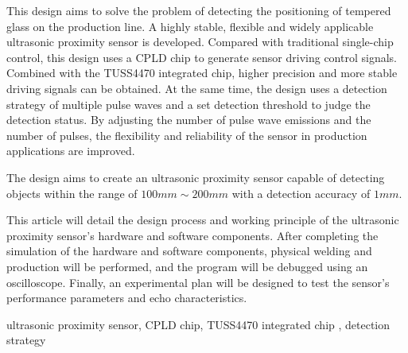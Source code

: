 \begin{EnAbstract}
    
    This design aims to solve the problem of detecting the positioning of tempered glass on the production line. A highly stable, flexible and widely applicable ultrasonic proximity sensor is developed. Compared with traditional single-chip control, this design uses a CPLD chip to generate sensor driving control signals. Combined with the TUSS4470 integrated chip, higher precision and more stable driving signals can be obtained. At the same time, the design uses a detection strategy of multiple pulse waves and a set detection threshold to judge the detection status. By adjusting the number of pulse wave emissions and the number of pulses, the flexibility and reliability of the sensor in production applications are improved.
    
    The design aims to create an ultrasonic proximity sensor capable of detecting objects within the range of $100mm \sim 200mm$ with a detection accuracy of $1mm$.
    
    This article will detail the design process and working principle of the ultrasonic proximity sensor's hardware and software components. After completing the simulation of the hardware and software components, physical welding and production will be performed, and the program will be debugged using an oscilloscope. Finally, an experimental plan will be designed to test the sensor's performance parameters and echo characteristics.
  
  
    \EnglishKeyWord ultrasonic proximity sensor, CPLD chip, TUSS4470 integrated chip , detection strategy
\end{EnAbstract}